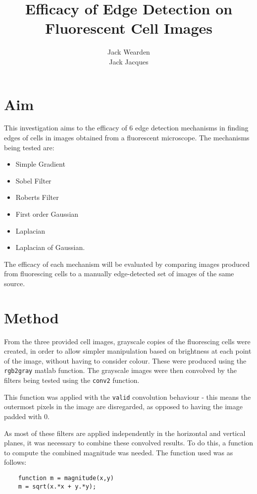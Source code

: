 \documentclass[12pt]{article}
\title{Efficacy of Edge Detection on Fluorescent Cell Images}
\date{}
\author{Jack Wearden\\Jack Jacques}
\begin{document}
  \maketitle
  \section{Aim}

  This investigation aims to the efficacy of 6 edge detection mechanisms in finding edges of cells in images obtained from a fluorescent microscope. The mechanisms being tested are:

  \begin{itemize}
    \itemsep1pt
    \parskip0pt
    \item Simple Gradient
    \item Sobel Filter
    \item Roberts Filter
    \item First order Gaussian
    \item Laplacian
    \item Laplacian of Gaussian.
  \end{itemize}

  The efficacy of each mechanism will be evaluated by comparing images produced from fluorescing cells to a manually edge-detected set of images of the same source.

  \section{Method}

  From the three provided cell images, grayscale copies of the fluorescing cells were created, in order to allow simpler manipulation based on brightness at each point of the image, without having to consider colour. These were produced using the \texttt{rgb2gray} matlab function. The grayscale images were then convolved by the filters being tested using the \texttt{conv2} function.

  This function was applied with the \texttt{valid} convolution behaviour - this means the outermost pixels in the image are disregarded, as opposed to having the image padded with 0.

  As most of these filters are applied independently in the horizontal and vertical planes, it was necessary to combine these convolved results. To do this, a function to compute the combined magnitude was needed. The function used was as follows:

  \begin{verbatim}
    function m = magnitude(x,y)
    m = sqrt(x.*x + y.*y);
  \end{verbatim}
\end{document}
